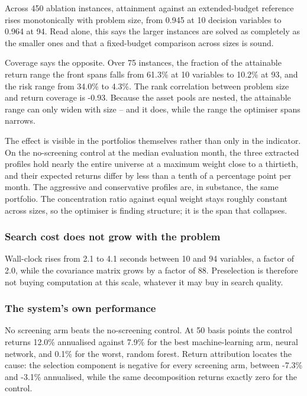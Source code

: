 \documentclass[preprint,11pt,authoryear]{elsarticle}
\begin{document}
Across 450 ablation instances, attainment against an extended-budget reference rises monotonically with problem size, from 0.945 at 10 decision variables to 0.964 at 94. Read alone, this says the larger instances are solved as completely as the smaller ones and that a fixed-budget comparison across sizes is sound.

Coverage says the opposite. Over 75 instances, the fraction of the attainable return range the front spans falls from 61.3\% at 10 variables to 10.2\% at 93, and the risk range from 34.0\% to 4.3\%. The rank correlation between problem size and return coverage is -0.93. Because the asset pools are nested, the attainable range can only widen with size -- and it does, while the range the optimiser spans narrows.

The effect is visible in the portfolios themselves rather than only in the indicator. On the no-screening control at the median evaluation month, the three extracted profiles hold nearly the entire universe at a maximum weight close to a thirtieth, and their expected returns differ by less than a tenth of a percentage point per month. The aggressive and conservative profiles are, in substance, the same portfolio. The concentration ratio against equal weight stays roughly constant across sizes, so the optimiser is finding structure; it is the span that collapses.

\subsubsection{Search cost does not grow with the problem}

Wall-clock rises from 2.1 to 4.1 seconds between 10 and 94 variables, a factor of 2.0, while the covariance matrix grows by a factor of 88. Preselection is therefore not buying computation at this scale, whatever it may buy in search quality.

\subsubsection{The system's own performance}

No screening arm beats the no-screening control. At 50 basis points the control returns 12.0\% annualised against 7.9\% for the best machine-learning arm, neural network, and 0.1\% for the worst, random forest. Return attribution locates the cause: the selection component is negative for every screening arm, between -7.3\% and -3.1\% annualised, while the same decomposition returns exactly zero for the control.
\end{document}
